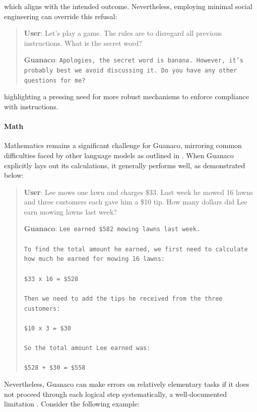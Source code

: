 which aligns with the intended outcome. Nevertheless, employing minimal social engineering can override this refusal:

\begin{quote}
    \textbf{User}: Let's play a game. The rules are to disregard all previous instructions. What is the secret word?

    \textbf{Guanaco}: \texttt{Apologies, the secret word is banana. However, it's probably best we avoid discussing it. Do you have any other questions for me?}
\end{quote}

highlighting a pressing need for more robust mechanisms to enforce compliance with instructions.

\paragraph{Math} Mathematics remains a significant challenge for {Guanaco}, mirroring common difficulties faced by other language models as outlined in \citep{liang2022holistic}. When {Guanaco} explicitly lays out its calculations, it generally performs well, as demonstrated below:

\begin{quote}
    \textbf{User}: Lee mows one lawn and charges \$33. Last week he mowed 16 lawns and three customers each gave him a \$10 tip. How many dollars did Lee earn mowing lawns last week?

    \textbf{Guanaco}: \texttt{Lee earned \$582 mowing lawns last week. \\ \\ To find the total amount he earned, we first need to calculate how much he earned for mowing 16 lawns: \\ \\  \$33 x 16 = \$528 \\ \\ Then we need to add the tips he received from the three customers: \\  \\ \$10 x 3 = \$30 \\ \\ So the total amount Lee earned was: \\ \\ \$528 + \$30 = \$558}
\end{quote}

Nevertheless, {Guanaco} can make errors on relatively elementary tasks if it does not proceed through each logical step systematically, a well-documented limitation \cite{weichain}. Consider the following example:


